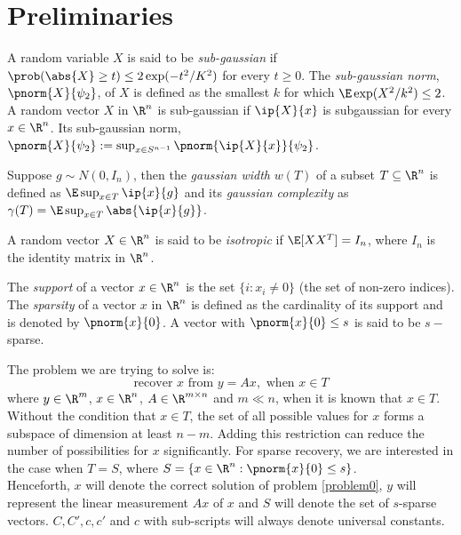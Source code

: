 \section{Preliminaries}
\begin{definition}
	A random variable $X$ is said to be \emph{sub-gaussian}
	if $\prob(\abs{X}\geq t)\leq 2\exp(-t^2/K^2)$ for
	every $t\geq 0$. The \emph{sub-gaussian norm}, $\pnorm{X}{\psi_2}$,
	of $X$ is defined as the smallest $k$ for which
	$\E\exp(X^2/k^2)\leq 2$.
	A random vector $X$ in $\R^n$ is sub-gaussian if
	$\ip{X}{x}$ is subgaussian for every $x\in\R^n$. Its
	sub-gaussian norm, $\pnorm{X}{\psi_2} := \sup_{x\in S^{n-1}}
	\pnorm{\ip{X}{x}}{\psi_2}$.
\end{definition}

\begin{definition}
	Suppose $g\sim N(0, I_n)$, then
	the \emph{gaussian width} $w(T)$ of a subset $T\subseteq \R^n$ is
	defined as $\E\sup_{x\in T}\ip{x}{g}$ and its \emph{gaussian
	complexity} as $\gamma(T) = \E\sup_{x\in T}\abs{\ip{x}{g}}$.
\end{definition}

\begin{definition}
	A random vector $X \in \R^n$ is said to
	be \emph{isotropic} if $\E[XX^T] = I_n$, where
	$I_n$ is the identity matrix in $\R^n$.
\end{definition}

\begin{definition}[Sparsity]
	The \emph{support} of a vector $x\in \R^n$ is the set
	$\{i: x_i\neq 0\}$ (the set of non-zero indices).
	The \emph{sparsity} of a vector $x$ in $\R^n$ is defined as the
	cardinality of its support and is denoted by $\pnorm{x}{0}$.
	A vector with $\pnorm{x}{0}\leq s$ is said to be $s-$sparse.
\end{definition}
The problem we are trying to solve is:
\begin{equation}\label{problem0}
	\text{recover }x\text{ from }y = Ax,\text{ when }x\in T
\end{equation}
where $y\in\R^m$, $x\in\R^n$, $A\in\R^{m\times n}$ and $m\ll n$, when
it is known that $x\in T$.
Without the condition that $x\in T$, the set of all possible values for $x$
forms a subspace of dimension at least $n-m$.
Adding this restriction can reduce the number of possibilities for $x$
significantly. For sparse recovery, we are interested in the case when
$T = S$, where $S = \{x\in\R^n: \pnorm{x}{0}\leq s\}$.\\

Henceforth, $x$ will denote the correct solution of problem \eqref{problem0},
$y$ will represent the linear measurement $Ax$ of $x$ and $S$
will denote the set of $s$-sparse vectors.
$C, C', c, c'$ and $c$ with sub-scripts will always denote universal
constants.
